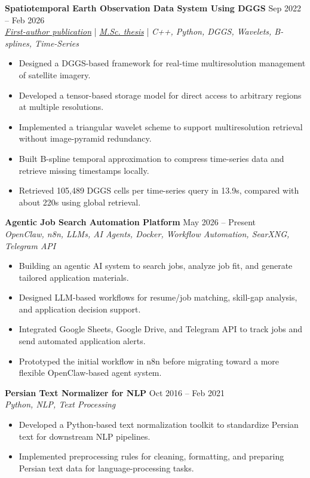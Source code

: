 \documentclass[a4paper,10pt]{article}
\begin{document}
\noindent
\textbf{Spatiotemporal Earth Observation Data System Using DGGS} \hfill Sep 2022 -- Feb 2026 \\
\textit{\href{https://doi.org/10.3390/rs17040570}{First-author publication}} | \textit{\href{https://ucalgary.scholaris.ca/items/114b394b-e516-4732-bd3a-45dd6160d480}{M.Sc. thesis}} | \textit{C++, Python, DGGS, Wavelets, B-splines, Time-Series}
\begin{itemize}[leftmargin=0.25in]
    \item Designed a DGGS-based framework for real-time multiresolution management of satellite imagery.
    \item Developed a tensor-based storage model for direct access to arbitrary regions at multiple resolutions.
    \item Implemented a triangular wavelet scheme to support multiresolution retrieval without image-pyramid redundancy.
    \item Built B-spline temporal approximation to compress time-series data and retrieve missing timestamps locally.
    \item Retrieved 105,489 DGGS cells per time-series query in 13.9s, compared with about 220s using global retrieval.
\end{itemize}

\noindent
\textbf{Agentic Job Search Automation Platform} \hfill May 2026 -- Present \\
\textit{OpenClaw, n8n, LLMs, AI Agents, Docker, Workflow Automation, SearXNG, Telegram API}
\begin{itemize}[leftmargin=0.25in]
    \item Building an agentic AI system to search jobs, analyze job fit, and generate tailored application materials.
    \item Designed LLM-based workflows for resume/job matching, skill-gap analysis, and application decision support.
    \item Integrated Google Sheets, Google Drive, and Telegram API to track jobs and send automated application alerts.
    \item Prototyped the initial workflow in n8n before migrating toward a more flexible OpenClaw-based agent system.
\end{itemize}

\noindent
\textbf{Persian Text Normalizer for NLP} \hfill Oct 2016 -- Feb 2021 \\
\textit{Python, NLP, Text Processing}
\begin{itemize}[leftmargin=0.25in]
    \item Developed a Python-based text normalization toolkit to standardize Persian text for downstream NLP pipelines.
    \item Implemented preprocessing rules for cleaning, formatting, and preparing Persian text data for language-processing tasks.
\end{itemize}
\end{document}

